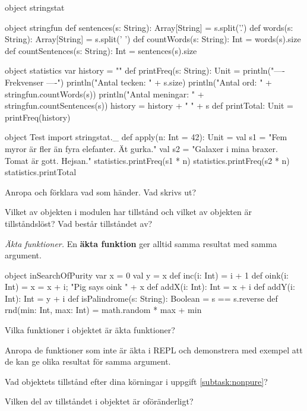 \begin{Code}
object stringstat {
  object stringfun {
    def sentences(s: String): Array[String] = s.split('.')
    def words(s: String): Array[String] = s.split(' ')
    def countWords(s: String): Int = words(s).size
    def countSentences(s: String): Int = sentences(s).size
  }
  
  object statistics {
    var history = ""
    def printFreq(s: String): Unit = {
      println("\n---- Frekvenser ----")
      println("Antal tecken:   " + s.size)
      println("Antal ord:      " + stringfun.countWords(s))
      println("Antal meningar: " + stringfun.countSentences(s))
      history = history + " " + s
    }
    def printTotal: Unit = printFreq(history)
  }
}
  
object Test {
  import stringstat._
  def apply(n: Int = 42): Unit = {
    val s1 = "Fem myror är fler än fyra elefanter. Ät gurka."
    val s2 = "Galaxer i mina braxer. Tomat är gott. Hejsan."
    statistics.printFreq(s1 * n)
    statistics.printFreq(s2 * n)
    statistics.printTotal
  }
}
\end{Code}

\Subtask Anropa  och förklara vad som händer. Vad skrivs ut?

\Subtask Vilket av objekten i modulen  har tillstånd och vilket av objekten är tillståndslöst? Vad består tillståndet av?


\Task \emph{Äkta funktioner.} En \textbf{äkta funktion} ger alltid samma resultat med samma argument.  

\begin{Code}
object inSearchOfPurity {
  var x = 0
  val y = x
  def inc(i: Int) = i + 1
  def oink(i: Int) = {x = x + i; "Pig says oink " + x}
  def addX(i: Int): Int = x + i
  def addY(i: Int): Int = y + i
  def isPalindrome(s: String): Boolean = s == s.reverse
  def rnd(min: Int, max: Int) = math.random * max + min
}
\end{Code}

\Subtask\Pen Vilka funktioner i objektet  är äkta funktioner?

\Subtask \label{subtask:nonpure} Anropa de funktioner som inte är äkta i REPL och demonstrera med exempel att de kan ge olika resultat för samma argument.

\Subtask Vad objektets tillstånd efter dina körningar i uppgift \ref{subtask:nonpure}? 

\Subtask Vilken del av tillståndet i objektet är oföränderligt?



